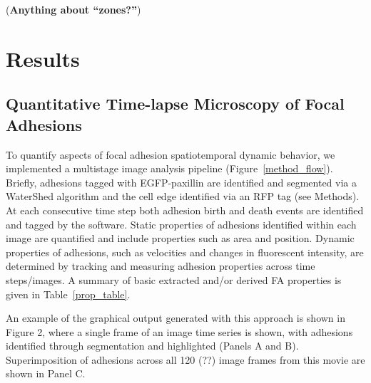\documentclass[10pt]{article}
\begin{document}
(\textbf{Anything about ``zones?''})



\section*{Results}


\subsection*{Quantitative Time-lapse Microscopy of Focal Adhesions}

To quantify aspects of focal adhesion spatiotemporal dynamic behavior, we implemented a multistage image analysis pipeline (Figure~\ref{method_flow}). Briefly, adhesions tagged with EGFP-paxillin are identified and segmented via a WaterShed algorithm and the cell edge identified via an RFP tag (see Methods). At each consecutive time step both adhesion birth and death events are identified and tagged by the software. Static properties of adhesions identified within each image are quantified and include properties such as area and position. Dynamic properties of adhesions, such as velocities and changes in fluorescent intensity, are determined by tracking and measuring adhesion properties across time steps/images. A summary of basic extracted and/or derived FA properties is given in Table~\ref{prop_table}.

An example of the graphical output generated with this approach is shown in Figure 2, where a single frame of an image time series is shown, with adhesions identified through segmentation and highlighted (Panels A and B). Superimposition of adhesions across all 120 (??) image frames from this movie are shown in Panel C.     
\end{document}
